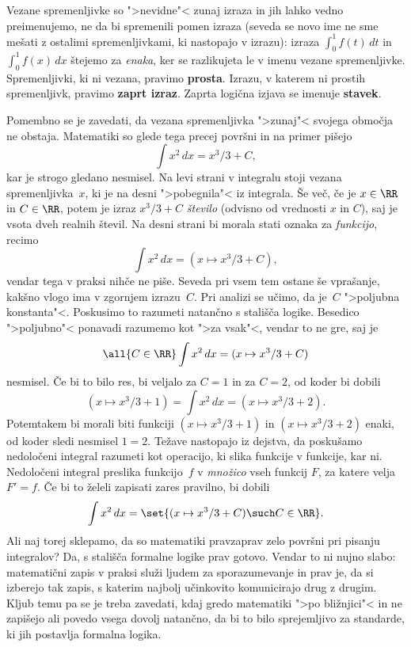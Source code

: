 Vezane spremenljivke so ">nevidne"< zunaj izraza in jih lahko vedno
preimenujemo, ne da bi spremenili pomen izraza (seveda se novo ime ne
sme mešati z ostalimi spremenljivkami, ki nastopajo v izrazu): izraza
$\int_0^1 f(t)\, d t$ in $\int_0^1 f(x)\, d x$ štejemo za
\emph{enaka}, ker se razlikujeta le v imenu vezane spremenljivke.
Spremenljivki, ki ni vezana, pravimo \textbf{prosta}. Izrazu, v katerem
ni prostih spremenljivk, pravimo \textbf{zaprt izraz}. Zaprta
logična izjava se imenuje \textbf{stavek}.

Pomembno se je zavedati, da vezana spremenljivka ">zunaj"< svojega
območja ne obstaja. Matematiki so glede tega precej površni in na
primer pišejo
%
\begin{equation*}
  \int x^2 \, d x = x^3/3 + C,
\end{equation*}
%
kar je strogo gledano nesmisel. Na levi strani v integralu stoji
vezana spremenljivka~$x$, ki je na desni ">pobegnila"< iz integrala.
Še več, če je $x \in \RR$ in $C \in \RR$, potem je izraz $x^3/3 + C$
\emph{število} (odvisno od vrednosti $x$ in $C$), saj je vsota dveh
realnih števil. Na desni strani bi morala stati oznaka za
\emph{funkcijo}, recimo
%
\begin{equation*}
  \int x^2 \, d x = (x \mapsto x^3/3 + C),
\end{equation*}
%
vendar tega v praksi nihče ne piše. Seveda pri vsem tem ostane še
vprašanje, kakšno vlogo ima v zgornjem izrazu~$C$. Pri analizi se
učimo, da je~$C$ ">poljubna konstanta"<. Poskusimo to razumeti
natančno s stališča logike. Besedico ">poljubno"< ponavadi razumemo
kot ">za vsak"<, vendar to ne gre, saj je
%
\begin{equation*}
  \all{C \in \RR} \int x^2 \, d x = (x \mapsto x^3/3 + C)
\end{equation*}
%
nesmisel. Če bi to bilo res, bi veljalo za $C = 1$ in za $C = 2$, od
koder bi dobili
%
\begin{equation*}
  (x \mapsto x^3/3 + 1) =
  \int x^2 \, d x =
  (x \mapsto x^3/3 + 2).
\end{equation*}
%
Potemtakem bi morali biti funkciji $(x \mapsto x^3/3 + 1)$ in $(x
\mapsto x^3/3 + 2)$ enaki, od koder sledi nesmisel $1 = 2$. Težave
nastopajo iz dejstva, da poskušamo nedoločeni integral razumeti kot
operacijo, ki slika funkcije v funkcije, kar ni. Nedoločeni integral
preslika funkcijo~$f$ v \emph{množico} vseh funkcij $F$, za katere
velja $F' = f$. Če bi to želeli zapisati zares pravilno, bi dobili
%
\begin{equation*}
  \int x^2 \, d x =
  \set{(x \mapsto x^3/3 + C) \such C \in \RR}.
\end{equation*}
%
Ali naj torej sklepamo, da so matematiki pravzaprav zelo površni pri
pisanju integralov? Da, s stališča formalne logike prav gotovo. Vendar
to ni nujno slabo: matematični zapis v praksi služi ljudem za
sporazumevanje in prav je, da si izberejo tak zapis, s katerim najbolj
učinkovito komunicirajo drug z drugim. Kljub temu pa se je treba
zavedati, kdaj gredo matematiki ">po bližnjici"< in ne zapišejo ali
povedo vsega dovolj natančno, da bi to bilo sprejemljivo za standarde,
ki jih postavlja formalna logika.


